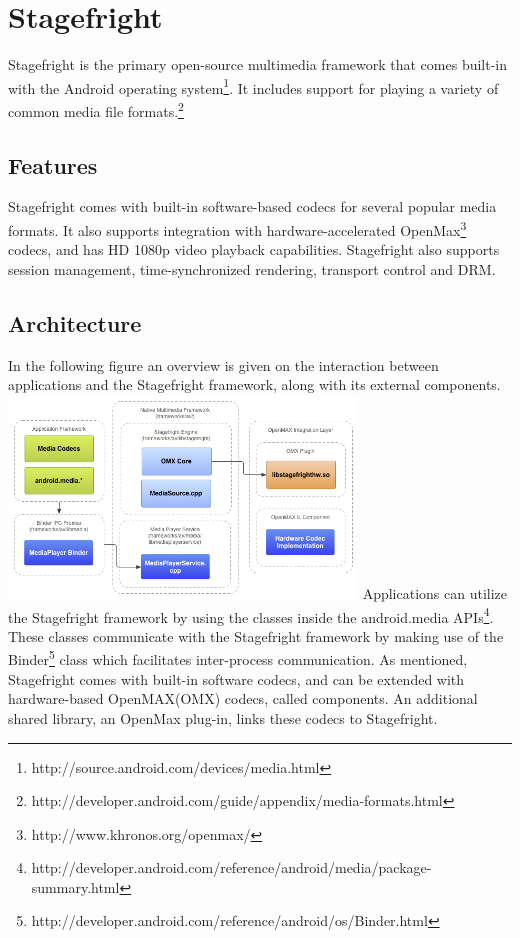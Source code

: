 \section{Stagefright}
Stagefright is the primary open-source multimedia framework that comes built-in with the Android operating system\footnote{http://source.android.com/devices/media.html}. It includes support for playing a variety of common media file formats.\footnote{http://developer.android.com/guide/appendix/media-formats.html}
\subsection{Features}
Stagefright comes with built-in software-based codecs for several popular media formats. It also supports integration with hardware-accelerated OpenMax\footnote{http://www.khronos.org/openmax/} codecs, and has HD 1080p video playback capabilities. Stagefright also supports session management, time-synchronized rendering, transport control and DRM.
\subsection{Architecture}
In the following figure an overview is given on the interaction between applications and the Stagefright framework, along with its external components.\\
\includegraphics[width=350px]{video_decoding/native.png}
Applications can utilize the Stagefright framework by using the classes inside the android.media APIs\footnote{http://developer.android.com/reference/android/media/package-summary.html}. These classes communicate with the Stagefright framework by making use of the Binder\footnote{http://developer.android.com/reference/android/os/Binder.html} class which facilitates inter-process communication. As mentioned, Stagefright comes with built-in software codecs, and can be extended with hardware-based OpenMAX(OMX) codecs, called components. An additional shared library, an OpenMax plug-in, links these codecs to Stagefright.
